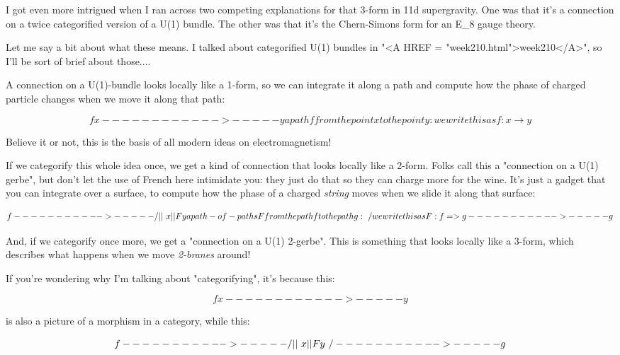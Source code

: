 I got even more intrigued when I ran across two competing 
explanations for that 3-form in 11d supergravity.  One was 
that it's a connection on a twice categorified version of 
a U(1) bundle.  The other was that it's the Chern-Simons
form for an E_{8} gauge theory. 

Let me say a bit about what these means.  I talked about categorified
U(1) bundles in "<A HREF = "week210.html">week210</A>", so
I'll be sort of brief about those....

A connection on a U(1)-bundle looks locally like a 1-form, 
so we can integrate it along a path and compute how the 
phase of charged particle changes when we move it along that 
path:


$$

             f
  x------------>-----y    a path f from the point x to the point y:
                                 we write this as f: x \to  y

$$
    
Believe it or not, this is the basis of all modern ideas on 
electromagnetism!

If we categorify this whole idea once, we get a kind of
connection that looks locally like a 2-form.  Folks call this
a "connection on a U(1) gerbe", but don't let the use of French 
here intimidate you: they just do that so they can charge more 
for the wine.  It's just a gadget that you can integrate over 
a surface, to compute how the phase of a charged \emph{string} moves 
when we slide it along that surface:


$$

              f
    ----------->-----
   /        ||       \
  x         ||F       y   a path-of-paths F from the path f to the path g:
   \        \/       /            we write this as F: f => g
    ----------->-----
               g
$$
    
And, if we categorify once more, we get a "connection on a 
U(1) 2-gerbe".  This is something that looks locally like a 
3-form, which describes what happens when we move \emph{2-branes} 
around!

If you're wondering why I'm talking about "categorifying", 
it's because this:


$$

             f
  x------------>-----y    
$$
    
is also a picture of a morphism in a category, while this:


$$

              f
    ----------->-----
   /        ||       \
  x         ||F       y  
   \        \/       /  
    ----------->-----
               g
$$
    
